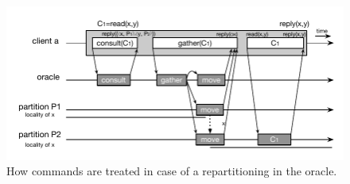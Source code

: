 \begin{figure}
\begin{minipage}[b]{1\linewidth} %
\centering
      \includegraphics[width=1.0\linewidth]{figures/new-scheme}
\end{minipage}
\caption{How commands are treated in case of a repartitioning in the oracle.}
\label{fig:oracle_repartition}
\end{figure}









